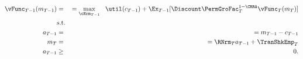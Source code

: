 \begin{equation*}\begin{gathered}\begin{aligned}
{\vFunc}_{T-1}({m}_{T-1})  & = &  = \max_{\cNrm_{T-1}} ~~ \util({c}_{T-1}) + \Ex_{T-1} [\Discount \PermGroFac_{T}^{1-\CRRA}{\vFunc}_{T}({m}_{T})] \label{eq:ConstrArt}
\\ & \mbox{s.t.}&  \nonumber
\\ {a}_{T-1}  & = &  = {m}_{T-1} - {c}_{T-1}
\\ {m}_{T}  & = &  = \RNrm_{T} {a}_{T-1} + \TranShkEmp_{T}
\\ {a}_{T-1} & \geq & 0 .
\end{aligned}\end{gathered}\end{equation*}
